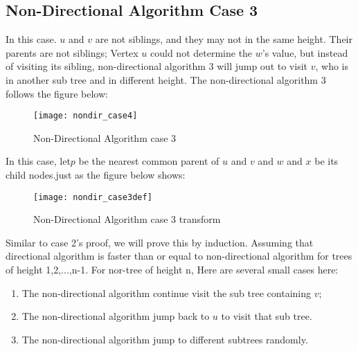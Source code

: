 \subsection{Non-Directional Algorithm Case 3}

In this case. $u$ and $v$ are not siblings, and they may not in the same height. Their parents are not siblings; Vertex $u$ could not determine the $w$'s value, but instead of visiting its sibling, non-directional algorithm 3 will jump out to visit $v$, who is in another sub tree and in different height. The non-directional algorithm 3 follows the figure below:
\begin{figure}[H]
	\centering
	\texttt{[image: nondir\_case4]}
	\caption{Non-Directional Algorithm case 3}
	\label{fig:nondircase4}
\end{figure}

	In this case, let$p$ be the nearest common parent of $u$ and $v$ and $w$ and $x$ be its child nodes.just as the figure below shows:
	\begin{figure}[H]
		\centering
		\texttt{[image: nondir\_case3def]}
		\caption{Non-Directional Algorithm case 3 transform }
		\label{fig:nondircase3def}
	\end{figure}
	Similar to case 2's proof, we will prove this by induction. Assuming that directional algorithm is faster than or equal to non-directional algorithm for trees of height 1,2,...,n-1. For nor-tree of height n, Here are several small cases here:
	\begin{enumerate}
		\item The non-directional algorithm continue visit the sub tree containing $v$;
		\item The  non-directional algorithm jump back to $u$ to visit that sub tree.
		\item The non-directional algorithm jump to different subtrees randomly.
	\end{enumerate}
	
